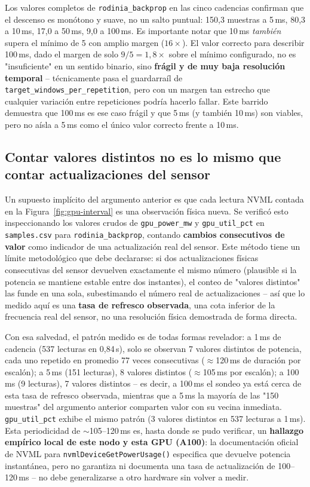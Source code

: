 Los valores completos de \texttt{rodinia\_backprop} en las cinco cadencias
confirman que el descenso es monótono y suave, no un salto puntual:
150{,}3 muestras a 5\,ms, 80{,}3 a 10\,ms, 17{,}0 a 50\,ms, 9{,}0 a 100\,ms.
Es importante notar que 10\,ms \emph{también} supera el mínimo de 5 con
amplio margen ($16\times$). El valor correcto para describir 100\,ms, dado
el margen de solo $9/5=1{,}8\times$ sobre el mínimo configurado, no es
"insuficiente" en un sentido binario, sino \textbf{frágil y de muy baja
resolución temporal} -- técnicamente pasa el guardarraíl de
\texttt{target\_windows\_per\_repetition}, pero con un margen tan estrecho
que cualquier variación entre repeticiones podría hacerlo fallar. Este
barrido demuestra que 100\,ms es ese caso frágil y que 5\,ms (y también
10\,ms) son viables, pero no aísla a 5\,ms como el único valor correcto
frente a 10\,ms.

\subsection{Contar valores distintos no es lo mismo que contar actualizaciones del sensor}

Un supuesto implícito del argumento anterior es que cada lectura NVML
contada en la Figura~\ref{fig:gpu-interval} es una observación física
nueva. Se verificó esto inspeccionando los valores crudos de
\texttt{gpu\_power\_mw} y \texttt{gpu\_util\_pct} en \texttt{samples.csv}
para \texttt{rodinia\_backprop}, contando \textbf{cambios consecutivos de
valor} como indicador de una actualización real del sensor. Este método
tiene un límite metodológico que debe declararse: si dos actualizaciones
físicas consecutivas del sensor devuelven exactamente el mismo número
(plausible si la potencia se mantiene estable entre dos instantes), el
conteo de "valores distintos" las funde en una sola, subestimando el
número real de actualizaciones -- así que lo medido aquí es una \textbf{tasa
de refresco observada}, una cota inferior de la frecuencia real del
sensor, no una resolución física demostrada de forma directa.

Con esa salvedad, el patrón medido es de todas formas revelador: a 1\,ms
de cadencia (537 lecturas en 0{,}84\,s), solo se observan 7 valores
distintos de potencia, cada uno repetido en promedio 77 veces
consecutivas ($\approx$120\,ms de duración por escalón); a 5\,ms (151
lecturas), 8 valores distintos ($\approx$105\,ms por escalón); a 100\,ms
(9 lecturas), 7 valores distintos -- es decir, a 100\,ms el sondeo ya está
cerca de esta tasa de refresco observada, mientras que a 5\,ms la mayoría
de las "150 muestras" del argumento anterior comparten valor con su
vecina inmediata. \texttt{gpu\_util\_pct} exhibe el mismo patrón (3
valores distintos en 537 lecturas a 1\,ms). Esta periodicidad de
$\sim$105--120\,ms es, hasta donde se pudo verificar, un \textbf{hallazgo
empírico local de este nodo y esta GPU (A100)}: la documentación oficial
de NVML para \texttt{nvmlDeviceGetPowerUsage()} especifica que devuelve
potencia instantánea, pero no garantiza ni documenta una tasa de
actualización de 100--120\,ms -- no debe generalizarse a otro hardware sin
volver a medir.

